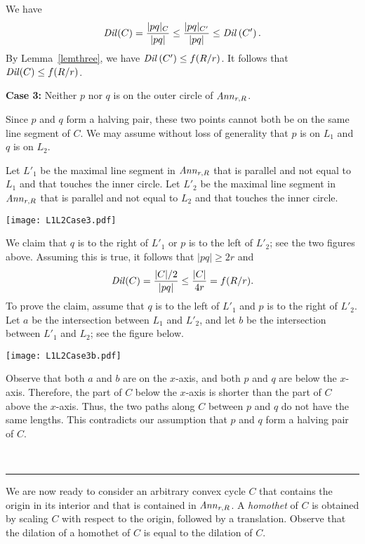 \documentclass[12pt]{article}
\newcommand{\Ann}{\mathord{\it Ann}}
\newcommand{\Dil}{\mathord{\it Dil}}
\newcommand{\qed}{\rule{0.5em}{1.5ex}}
\newcommand{\fqed}{{\hfill~\qed}}
\newenvironment{proof}{{\noindent \bf Proof.}}
                      {{\hfill \fqed} \vspace{1em}}
\begin{document}
\begin{proof}
We have 
\[ \Dil(C) = \frac{|pq|_C}{|pq|} \leq \frac{|pq|_{C'}}{|pq|} \leq  
   \Dil \left( C' \right) . 
\] 
By Lemma~\ref{lemthree}, we have $\Dil \left( C' \right) \leq f(R/r)$. 
It follows that $\Dil(C) \leq f(R/r)$. 

\vspace{0.5em} 

\noindent 
{\bf Case 3:} Neither $p$ nor $q$ is on the outer circle of $\Ann_{r,R}$. 

Since $p$ and $q$ form a halving pair, these two points cannot both be 
on the same line segment of $C$. We may assume without loss of 
generality that $p$ is on $L_1$ and $q$ is on $L_2$. 

Let $L'_1$ be the maximal line segment in $\Ann_{r,R}$ that is parallel 
and not equal to $L_1$ and that touches the inner circle.  
Let $L'_2$ be the maximal line segment in $\Ann_{r,R}$ that is parallel 
and not equal to $L_2$ and that touches the inner circle.  

\begin{center}
   \texttt{[image: L1L2Case3.pdf]}
\end{center}

We claim that $q$ is to the right of $L'_1$ or $p$ is to the left of 
$L'_2$; see the two figures above. Assuming this is true, it follows 
that $|pq| \geq 2r$ and 
\[ \Dil(C) = \frac{|C|/2}{|pq|} \leq \frac{|C|}{4r} = f(R/r) . 
\]  
To prove the claim, assume that $q$ is to the left of $L'_1$ and $p$ is 
to the right of $L'_2$. Let $a$ be the intersection between $L_1$ and 
$L'_2$, and let $b$ be the intersection between $L'_1$ and $L_2$; see 
the figure below. 

\begin{center}
   \texttt{[image: L1L2Case3b.pdf]}
\end{center}

Observe that both $a$ and $b$ are on the $x$-axis, and both $p$ and $q$ 
are below the $x$-axis. Therefore, the part of $C$ below the $x$-axis is 
shorter than the part of $C$ above the $x$-axis. Thus, the two paths 
along $C$ between $p$ and $q$ do not have the same lengths. This  
contradicts our assumption that $p$ and $q$ form a halving pair of 
$C$.     
\end{proof}  

We are now ready to consider an arbitrary convex cycle $C$ that contains 
the origin in its interior and that is contained in $\Ann_{r,R}$. 
A \emph{homothet} of $C$ is obtained by scaling $C$ with respect to the 
origin, followed by a translation. Observe that the dilation of a 
homothet of $C$ is equal to the dilation of $C$. 
\end{document}
